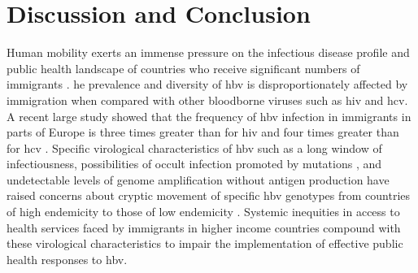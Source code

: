 \section{Discussion and Conclusion}
Human mobility exerts an immense pressure on the infectious disease profile and public health landscape of countries who receive significant numbers of immigrants \citep{thijssen_mass_2019}.
he prevalence and diversity of \gls{hbv} is disproportionately affected by immigration when compared with other bloodborne viruses such as \gls{hiv} and \gls{hcv}.
A recent large study showed that the frequency of \gls{hbv} infection in immigrants in parts of Europe is three times greater than for \gls{hiv} and four times greater than for \gls{hcv} \citep{gonzalez_overt_2020}.
Specific virological characteristics of \gls{hbv} such as a long window of infectiousness, possibilities of occult infection promoted by mutations \citep{pronier_contribution_2020,olusola_profiles_2021,raimondo_update_2019}, and undetectable levels of genome amplification without antigen production have raised concerns about cryptic movement of specific \gls{hbv} genotypes from countries of high endemicity to those of low endemicity \citep{azarkar_epidemiology_2019,zhu2016genetic,bedi_occult_2021}.
Systemic inequities in access to health services faced by immigrants in higher income countries \citep{smith_migrant_2018} compound with these virological characteristics to impair the implementation of effective public health responses to \gls{hbv}.\\

